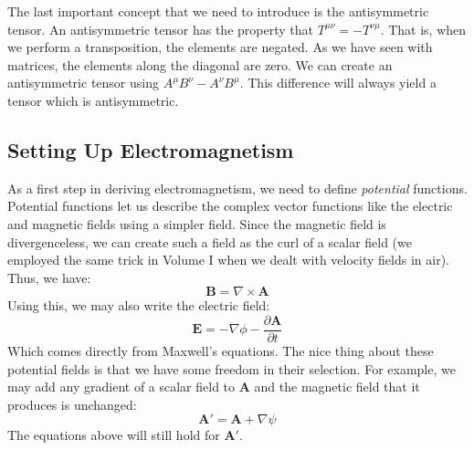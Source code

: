 The last important concept that we need to introduce is the antisymmetric tensor. An antisymmetric tensor has the property that $T^{\mu\nu}=-T^{\nu\mu}$. That is, when we perform a transposition, the elements are negated. As we have seen with matrices, the elements along the diagonal are zero. We can create an antisymmetric tensor using $A^\mu B^\nu-A^\nu B^\mu$. This difference will always yield a tensor which is antisymmetric.


\subsection{Setting Up Electromagnetism}
As a first step in deriving electromagnetism, we need to define \textit{potential} functions. Potential functions let us describe the complex vector functions like the electric and magnetic fields using a simpler field. Since the magnetic field is divergenceless, we can create such a field as the curl of a scalar field (we employed the same trick in Volume I when we dealt with velocity fields in air). Thus, we have:
$$\bm{B}=\nabla\times\bm{A}$$
Using this, we may also write the electric field:
$$\bm{E}=-\nabla \phi-\frac{\partial \bm{A}}{\partial t}$$
Which comes directly from Maxwell's equations. The nice thing about these potential fields is that we have some freedom in their selection. For example, we may add any gradient of a scalar field to $\bm{A}$ and the magnetic field that it produces is unchanged:
$$\bm{A}'=\bm{A}+\nabla\psi$$
The equations above will still hold for $\bm{A}'$. 



